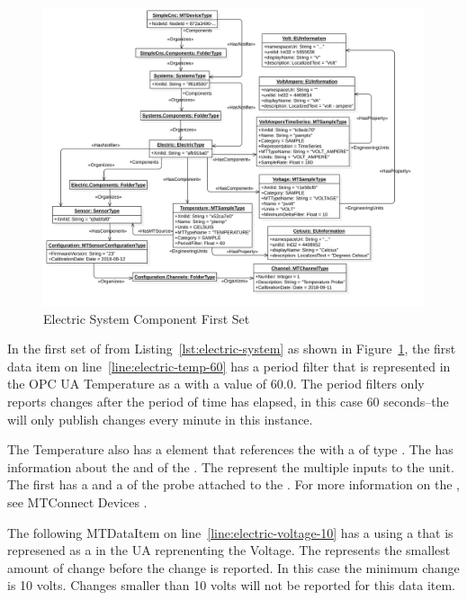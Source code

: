 \begin{figure}[ht]
  \centering
  \includegraphics[width=1.0\textwidth]{diagrams/mtconnect-mapping/electric-system.png}
  \caption{Electric System Component First Set}
  \label{fig:electric-system}
\end{figure}

In the first set of  from Listing~\ref{lst:electric-system} as shown in Figure~\ref{fig:electric-system}, the first data item on line~\ref{line:electric-temp-60} has a period filter that is represented in the OPC UA  Temperature as a   with a value of 60.0. The period filters only reports changes after the period of time has elapsed, in this case 60 seconds--the  will only publish changes every minute in this instance.

The Temperature  also has a  element that references the  with a  of type . The  has information about the  and  of the . The  represent the multiple inputs to the  unit. The first  has a  and a  of the probe attached to the . For more information on the , see MTConnect Devices \cite{MTCPart2}.

The following \gls{MTDataItem} on line~\ref{line:electric-voltage-10} has a  using a  that is represened as a  in the UA  reprenenting the  Voltage. The  represents the smallest amount of change before the change is reported. In this case the minimum change is 10 volts. Changes smaller than 10 volts will not be reported for this data item.

